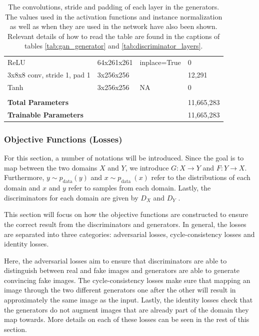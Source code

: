 \documentclass[11pt, fleqn, titlepage]{article}
\newcommand{\1}[1]{\mathds{1}\left[#1\right]}
\begin{document}
\begin{table}[H]
\begin{tabular}{llll}
		ReLU                                        & 64x261x261     & inplace=True& 0             \\
		3x8x8 conv, stride 1, pad 1                 & 3x256x256      &             & 12,291        \\
		Tanh                                        & 3x256x256      & NA          & 0             \\
		                                            &                &             &               \\
		\textbf{Total Parameters}                   &                &             & 11,665,283    \\
		\textbf{Trainable Parameters}               &                &             & 11,665,283    \\ \bottomrule
	\end{tabular}
	\caption{The convolutions, stride and padding of each layer in the generators. The values used in the activation functions and instance normalization as well as when they are used in the network have also been shown. Relevant details of how to read the table are found in the captions of tables \ref{tab:gan_generator} and \ref{tab:discriminator_layers}.}
	\label{tab:generator_layers}
\end{table}

\subsubsection{Objective Functions (Losses)}
For this section, a number of notations will be introduced. Since the goal is to map between the two domains $X$ and $Y$, we introduce $G : X \rightarrow Y$ and $F : Y \rightarrow X$. Furthermore, $y \sim p_{\text {data}}(y)$ and $x \sim p_{\text {data }}(x)$ refer to the distributions of each domain and $x$ and $y$ refer to samples from each domain. Lastly, the discriminators for each domain are given by $D_X$ and $D_Y$ \cite{original_cyclegan}.

This section will focus on how the objective functions are constructed to ensure the correct result from the discriminators and generators. In general, the losses are separated into three categories: adversarial losses, cycle-consistency losses and identity losses. 

Here, the adversarial losses aim to ensure that discriminators are able to distinguish between real and fake images and generators are able to generate convincing fake images. The cycle-consistency losses make sure that mapping an image through the two different generators one after the other will result in approximately the same image as the input. Lastly, the identity losses check that the generators do not augment images that are already part of the domain they map towards. More details on each of these losses can be seen in the rest of this section.
\end{document}
